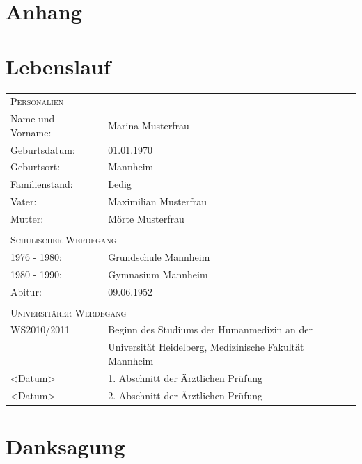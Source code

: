 \documentclass{scrreprt}
\begin{document}
\chapter*{Anhang}




\chapter*{Lebenslauf}

\begin{tabular}{p{4cm}l}
	\multicolumn{2}{l}{{\large \scshape{Personalien}}} \\[0,6em]
	
	Name und Vorname:	& Marina Musterfrau \\[0,5em]
	
	Geburtsdatum: 		& 01.01.1970 \\[0,5em]
	
	Geburtsort: 		& Mannheim \\[0,5em]
	
	Familienstand: 		& Ledig\\[0,5em]
	
	Vater: 				& Maximilian Musterfrau \\[0,5em]
	
	Mutter: 			& Mörte Musterfrau \\[0,5em]
	& \\[0,5em]
	\multicolumn{2}{l}{{\Large \scshape{Schulischer Werdegang}}} \\[0,6em]
	
	1976 - 1980: 	& Grundschule Mannheim\\[0,5em]

	1980 - 1990: 	& Gymnasium Mannheim\\[0,5em]

	Abitur: 			& 09.06.1952 \\[0,5em]
	&\\[0,5em]
		\multicolumn{2}{l}{{\Large \scshape{Universitärer Werdegang}}} \\[0,6em]
	WS2010/2011			& Beginn des Studiums der Humanmedizin an der \\
						& Universität Heidelberg, Medizinische Fakultät Mannheim\\ [0,5em]
						
	<Datum> 		& 1. Abschnitt der Ärztlichen Prüfung\\
	<Datum> 		& 2. Abschnitt der Ärztlichen Prüfung
\end{tabular}



\chapter*{Danksagung}
\end{document}
